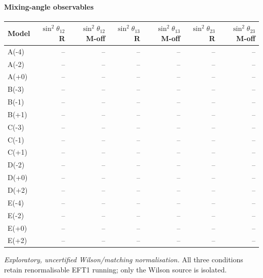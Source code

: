 \paragraph{Mixing-angle observables}
\begin{center}
\begin{tabular}{lrrrrrr}
\hline
Model & $\sin^2\theta_{12}$ R & $\sin^2\theta_{12}$ M-off & $\sin^2\theta_{13}$ R & $\sin^2\theta_{13}$ M-off & $\sin^2\theta_{23}$ R & $\sin^2\theta_{23}$ M-off \\
\hline
A(-4) & -- & -- & -- & -- & -- & -- \\
A(-2) & -- & -- & -- & -- & -- & -- \\
A(+0) & -- & -- & -- & -- & -- & -- \\
B(-3) & -- & -- & -- & -- & -- & -- \\
B(-1) & -- & -- & -- & -- & -- & -- \\
B(+1) & -- & -- & -- & -- & -- & -- \\
C(-3) & -- & -- & -- & -- & -- & -- \\
C(-1) & -- & -- & -- & -- & -- & -- \\
C(+1) & -- & -- & -- & -- & -- & -- \\
D(-2) & -- & -- & -- & -- & -- & -- \\
D(+0) & -- & -- & -- & -- & -- & -- \\
D(+2) & -- & -- & -- & -- & -- & -- \\
E(-4) & -- & -- & -- & -- & -- & -- \\
E(-2) & -- & -- & -- & -- & -- & -- \\
E(+0) & -- & -- & -- & -- & -- & -- \\
E(+2) & -- & -- & -- & -- & -- & -- \\
\hline
\end{tabular}
\end{center}
\noindent\emph{Exploratory, uncertified Wilson/matching normalisation.} 
All three conditions retain renormalisable EFT1 running; only the Wilson source is isolated.
